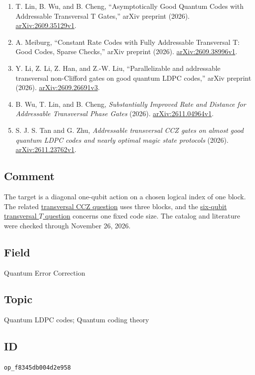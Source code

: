 \begin{enumerate}[label={},leftmargin=4.8em,labelsep=0.5em]
  \footnotesize
  \item[\textup{[LWC26]}]\label{ref:atq-lwc}
  T. Lin, B. Wu, and B. Cheng, ``Asymptotically Good Quantum Codes with Addressable Transversal T Gates,'' arXiv preprint (2026). \href{https://arxiv.org/abs/2609.35129v1}{arXiv:2609.35129v1}.

  \item[\textup{[Mei26]}]\label{ref:atq-meiburg}
  A. Meiburg, ``Constant Rate Codes with Fully Addressable Transversal T: Good Codes, Sparse Checks,'' arXiv preprint (2026). \href{https://arxiv.org/abs/2609.38996v1}{arXiv:2609.38996v1}.

  \item[\textup{[LLHL26]}]\label{ref:atq-llhl}
  Y. Li, Z. Li, Z. Han, and Z.-W. Liu, ``Parallelizable and addressable transversal non-Clifford gates on good quantum LDPC codes,'' arXiv preprint (2026). \href{https://arxiv.org/abs/2609.26691v3}{arXiv:2609.26691v3}.

  \item[\textup{[WLC26]}]\label{ref:atq-wlc}
  B. Wu, T. Lin, and B. Cheng, \emph{Substantially Improved Rate and Distance for Addressable Transversal Phase Gates} (2026). \href{https://arxiv.org/abs/2611.04964v1}{arXiv:2611.04964v1}.

  \item[\textup{[TZ26]}]\label{ref:atq-tz}
  S. J. S. Tan and G. Zhu, \emph{Addressable transversal CCZ gates on almost good quantum LDPC codes and nearly optimal magic state protocols} (2026). \href{https://arxiv.org/abs/2611.23762v1}{arXiv:2611.23762v1}.
\end{enumerate}

\subsection*{Comment}

The target is a diagonal one-qubit action on a chosen logical index of one block. The related \href{https://qiqc-op.com/problem/op_15c6d5adf1796d86/}{transversal CCZ question} uses three blocks, and the \href{https://qiqc-op.com/problem/op_ddfbbe7ca0ead0c8/}{six-qubit transversal $T$ question} concerns one fixed code size. The catalog and literature were checked through November 26, 2026.

\subsection*{Field}

Quantum Error Correction

\subsection*{Topic}

Quantum LDPC codes; Quantum coding theory

\subsection*{ID}

\texttt{op\_f8345db004d2e958}
